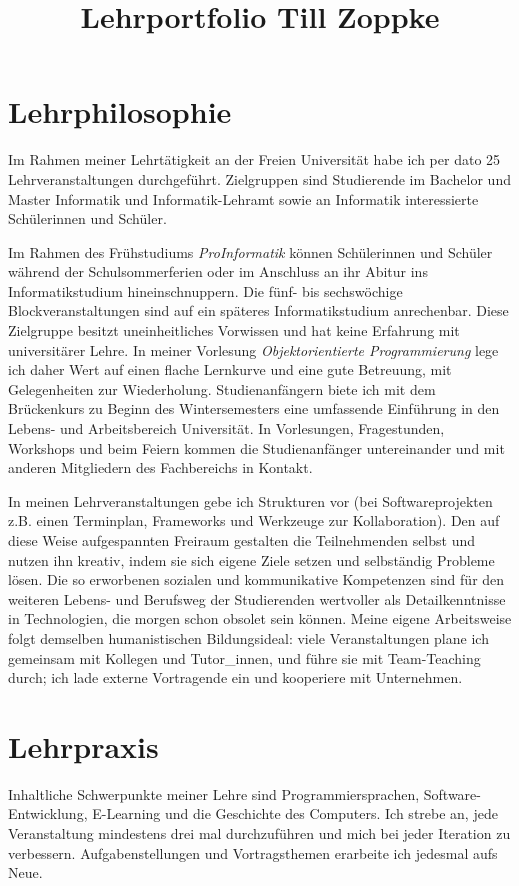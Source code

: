 \documentclass[11pt,ngerman]{article}
\begin{document}
\title{Lehrportfolio Till Zoppke}
\maketitle

\section{Lehrphilosophie}
Im Rahmen meiner Lehrtätigkeit an der Freien Universität habe ich per dato 25 Lehrveranstaltungen durchgeführt. Zielgruppen sind Studierende im Bachelor und Master Informatik und Informatik-Lehramt sowie an Informatik interessierte Schülerinnen und Schüler.

Im Rahmen des Frühstudiums \emph{ProInformatik} können Schülerinnen und Schüler während der Schulsommerferien oder im Anschluss an ihr Abitur ins Informatikstudium hineinschnuppern. Die fünf- bis sechswöchige Blockveranstaltungen sind auf ein späteres Informatikstudium anrechenbar. Diese Zielgruppe besitzt uneinheitliches Vorwissen und hat keine Erfahrung mit universitärer Lehre. In meiner Vorlesung \emph{Objektorientierte Programmierung} lege ich daher Wert auf einen flache Lernkurve und eine gute Betreuung, mit Gelegenheiten zur Wiederholung. Studienanfängern biete ich mit dem Brückenkurs zu Beginn des Wintersemesters eine umfassende Einführung in den Lebens- und Arbeitsbereich Universität. In Vorlesungen, Fragestunden, Workshops und beim Feiern kommen die Studienanfänger untereinander und mit anderen Mitgliedern des Fachbereichs in Kontakt.

In meinen Lehrveranstaltungen gebe ich Strukturen vor (bei Softwareprojekten z.B. einen Terminplan, Frameworks und Werkzeuge zur Kollaboration). Den auf diese Weise aufgespannten Freiraum gestalten die Teilnehmenden selbst und nutzen ihn kreativ, indem sie sich eigene Ziele setzen und selbständig Probleme lösen. Die so erworbenen sozialen und kommunikative Kompetenzen sind für den weiteren Lebens- und Berufsweg der Studierenden wertvoller als Detailkenntnisse in Technologien, die morgen schon obsolet sein können. Meine eigene Arbeitsweise folgt demselben humanistischen Bildungsideal: viele Veranstaltungen plane ich gemeinsam mit Kollegen und Tutor\_innen, und führe sie mit Team-Teaching durch; ich lade externe Vortragende ein und kooperiere mit Unternehmen.

\section{Lehrpraxis}
Inhaltliche Schwerpunkte meiner Lehre sind Programmiersprachen, Software-Entwicklung, E-Learning und die Geschichte des Computers. Ich strebe an, jede Veranstaltung mindestens drei mal durchzuführen und mich bei jeder Iteration zu verbessern. Aufgabenstellungen und Vortragsthemen erarbeite ich jedesmal aufs Neue. 
\end{document}
